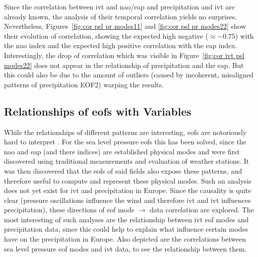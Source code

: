 Since the correlation between \ac{ivt} and \ac{nao}/\ac{eap} and precipitation and \ac{ivt} are already known, the analysis of their temporal correlation yields no surprises. 
Nevertheless, Figures~\ref{fig:cor psl pr modes11} and \ref{fig:cor psl pr modes22} show their evolution of correlation, showing the expected high negative ($\approx -0.75$) with the \ac{nao} index and the expected high positive correlation with the \ac{eap} index. 
Interestingly, the drop of correlation which was visible in Figure~\ref{fig:cor ivt psl modes22} does not appear in the relationship of precipitation and the \ac{eap}. 
But this could also be due to the amount of outliers (caused by incoherent, misaligned patterns of precipitation EOF2) warping the results. 




\subsection{Relationships of \acp{eof} with Variables}

While the relationships of different patterns are interesting, \acp{eof} are notoriously hard to interpret \cite{hannachi_empirical_2007, dommenget_cautionary_2002}. 
For the sea level pressure \acp{eof} this has been solved, since the \ac{nao} and \ac{eap} (and there indices) are established physical modes and were first discovered using traditional measurements and evaluation of weather stations. 
It was then discovered that the \acp{eof} of said fields also expose these patterns, and therefore useful to compute and represent these physical modes.  
Such an analysis does not yet exist for \ac{ivt} and precipitation in Europe. 
Since the causality is quite clear (pressure oscillations influence the wind and therefore \ac{ivt} and \ac{ivt} influences precipitation), these directions of \ac{eof} mode $\rightarrow$ data correlation are explored. 
The most interesting of such analyses are the relationship between \ac{ivt} \ac{eof} modes and precipitation data, since this could help to explain what influence certain modes have on the precipitation in Europe. 
Also depicted are the correlations between sea level pressure \ac{eof} modes and \ac{ivt} data, to see the relationship between them. 



